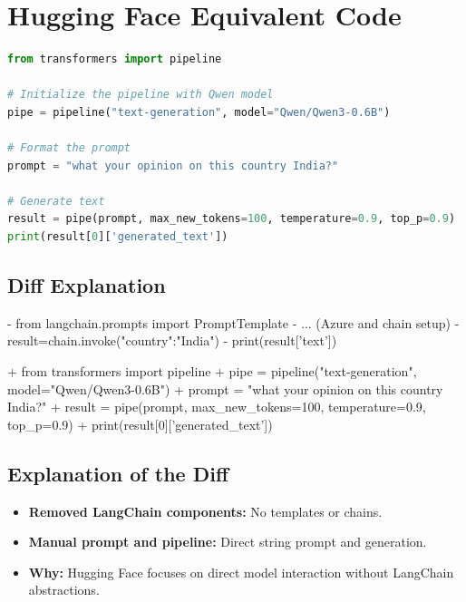 \documentclass[11pt, a4paper]{article}
\begin{document}
\section{Hugging Face Equivalent Code}
\begin{lstlisting}[language=Python]
from transformers import pipeline

# Initialize the pipeline with Qwen model
pipe = pipeline("text-generation", model="Qwen/Qwen3-0.6B")

# Format the prompt
prompt = "what your opinion on this country India?"

# Generate text
result = pipe(prompt, max_new_tokens=100, temperature=0.9, top_p=0.9)
print(result[0]['generated_text'])
\end{lstlisting}

\subsection{Diff Explanation}
\begin{removedcode}
\begin{diffverb}
- from langchain.prompts import PromptTemplate
- ... (Azure and chain setup)
- result=chain.invoke({"country":"India"})
- print(result['text'])
\end{diffverb}
\end{removedcode}

\begin{addedcode}
\begin{diffverb}
+ from transformers import pipeline
+ pipe = pipeline("text-generation", model="Qwen/Qwen3-0.6B")
+ prompt = "what your opinion on this country India?"
+ result = pipe(prompt, max_new_tokens=100, temperature=0.9, top_p=0.9)
+ print(result[0]['generated_text'])
\end{diffverb}
\end{addedcode}


\subsection{Explanation of the Diff}
\begin{itemize}
    \item \textbf{Removed LangChain components:} No templates or chains.
    \item \textbf{Manual prompt and pipeline:} Direct string prompt and generation.
    \item \textbf{Why:} Hugging Face focuses on direct model interaction without LangChain abstractions.
\end{itemize}
\end{document}
